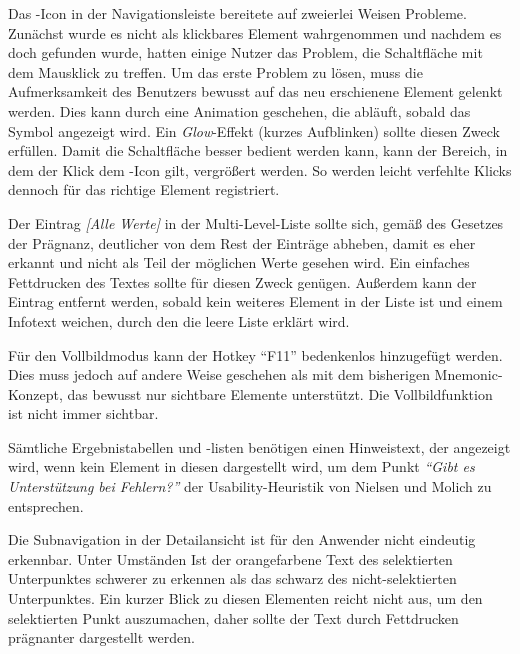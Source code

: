 Das -Icon in der Navigationsleiste bereitete auf zweierlei Weisen Probleme. Zunächst wurde es nicht als klickbares Element wahrgenommen und nachdem es doch gefunden wurde, hatten einige Nutzer das Problem, die Schaltfläche mit dem Mausklick zu treffen. Um das erste Problem zu lösen, muss die Aufmerksamkeit des Benutzers bewusst auf das neu erschienene Element gelenkt werden. Dies kann durch eine Animation geschehen, die abläuft, sobald das Symbol angezeigt wird. Ein \textit{Glow}-Effekt (kurzes Aufblinken) sollte diesen Zweck erfüllen. Damit die Schaltfläche besser bedient werden kann, kann der Bereich, in dem der Klick dem -Icon gilt, vergrößert werden. So werden leicht verfehlte Klicks dennoch für das richtige Element registriert.\par
Der Eintrag \textit{[Alle Werte]} in der Multi-Level-Liste sollte sich, gemäß des Gesetzes der Prägnanz, deutlicher von dem Rest der Einträge abheben, damit es eher erkannt und nicht als Teil der möglichen Werte gesehen wird. Ein einfaches Fettdrucken des Textes sollte für diesen Zweck genügen. Außerdem kann der Eintrag entfernt werden, sobald kein weiteres Element in der Liste ist und einem Infotext weichen, durch den die leere Liste erklärt wird.\par
Für den Vollbildmodus kann der Hotkey \enquote{F11} bedenkenlos hinzugefügt werden. Dies muss jedoch auf andere Weise geschehen als mit dem bisherigen Mnemonic-Konzept, das bewusst nur sichtbare Elemente unterstützt. Die Vollbildfunktion ist nicht immer sichtbar.\par
Sämtliche Ergebnistabellen und -listen benötigen einen Hinweistext, der angezeigt wird, wenn kein Element in diesen dargestellt wird, um dem Punkt \textit{\enquote{Gibt es Unterstützung bei Fehlern?}} der Usability-Heuristik von Nielsen und Molich zu entsprechen.\par
Die Subnavigation in der Detailansicht ist für den Anwender nicht eindeutig erkennbar. Unter Umständen Ist der orangefarbene Text des selektierten Unterpunktes schwerer zu erkennen als das schwarz des nicht-selektierten Unterpunktes. Ein kurzer Blick zu diesen Elementen reicht nicht aus, um den selektierten Punkt auszumachen, daher sollte der Text durch Fettdrucken prägnanter dargestellt werden.\par
